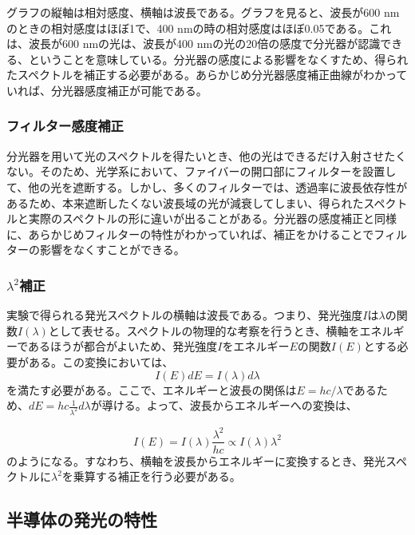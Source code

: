 \documentclass[11pt,a4j]{jsarticle}
\begin{document}
グラフの縦軸は相対感度、横軸は波長である。グラフを見ると、波長が600 nmのときの相対感度はほぼ1で、400 nmの時の相対感度はほぼ0.05である。これは、波長が600 nmの光は、波長が400 nmの光の20倍の感度で分光器が認識できる、ということを意味している。分光器の感度による影響をなくすため、得られたスペクトルを補正する必要がある。あらかじめ分光器感度補正曲線がわかっていれば、分光器感度補正が可能である。

\subsubsection{フィルター感度補正}

分光器を用いて光のスペクトルを得たいとき、他の光はできるだけ入射させたくない。そのため、光学系において、ファイバーの開口部にフィルターを設置して、他の光を遮断する。しかし、多くのフィルターでは、透過率に波長依存性があるため、本来遮断したくない波長域の光が減衰してしまい、得られたスペクトルと実際のスペクトルの形に違いが出ることがある。分光器の感度補正と同様に、あらかじめフィルターの特性がわかっていれば、補正をかけることでフィルターの影響をなくすことができる。

\subsubsection{$\lambda^2$補正}

実験で得られる発光スペクトルの横軸は波長である。つまり、発光強度$I$は$\lambda$の関数$I(\lambda)$として表せる。スペクトルの物理的な考察を行うとき、横軸をエネルギーであるほうが都合がよいため、発光強度$I$をエネルギー$E$の関数$I(E)$とする必要がある。この変換においては、
\begin{equation}
  I(E)dE=I(\lambda)d\lambda \nonumber
\end{equation}
を満たす必要がある。ここで、エネルギーと波長の関係は$E=hc/\lambda$であるため、$dE=hc\frac{1}{\lambda^2}d\lambda$が導ける。よって、波長からエネルギーへの変換は、

\begin{equation}
  I(E)=I(\lambda)\frac{\lambda^2}{hc}\propto I(\lambda)\lambda^2 \nonumber
\end{equation}
のようになる。すなわち、横軸を波長からエネルギーに変換するとき、発光スペクトルに$\lambda^2$を乗算する補正を行う必要がある。

\newpage
\subsection{半導体の発光の特性}
\end{document}
